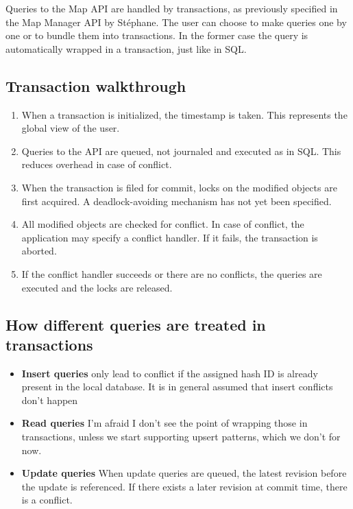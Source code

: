 \documentclass{article}
\begin{document}
Queries to the Map API are handled by transactions, as previously specified in
the Map Manager API by Stéphane. The user can choose to make queries one by one
or to bundle them into transactions. In the former case the query is
automatically wrapped in a transaction, just like in SQL.

\subsection{Transaction walkthrough}

\begin{enumerate} \itemsep0em
  \item When a transaction is initialized, the timestamp is taken. This
    represents the global view of the user.
  \item Queries to the API are queued, not journaled and executed as in SQL.
    This reduces overhead in case of conflict.
  \item When the transaction is filed for commit, locks on the modified objects
    are first acquired. A deadlock-avoiding mechanism has not yet been
    specified.
  \item All modified objects are checked for conflict. In case of conflict,
    the application may specify a conflict handler. If it fails, the 
    transaction is aborted.
  \item If the conflict handler succeeds or there are no conflicts, the 
    queries are executed and the locks are released.
\end{enumerate}

\subsection{How different queries are treated in transactions}

\begin{itemize} \itemsep0em
  \item {\bf Insert queries} only lead to conflict if the assigned hash ID is
    already present in the local database. It is in general assumed that insert
    conflicts don't happen 
  \item {\bf Read queries} I'm afraid I don't see the point of wrapping
    those in transactions, unless we start supporting upsert patterns, which we
    don't for now. 
  \item {\bf Update queries} When update queries are queued, the latest
    revision before the update is referenced. If there exists a later revision 
    at commit time, there is a conflict. 
\end{itemize}
\end{document}

